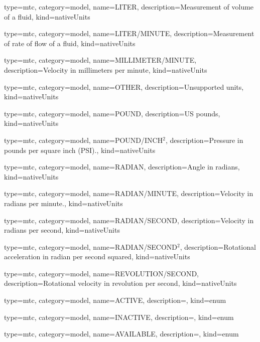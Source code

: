 {
  type=mtc,
  category=model,
  name={LITER},
  description={Measurement of volume of a fluid},
  kind={nativeUnits}
}


{
  type=mtc,
  category=model,
  name={LITER/MINUTE},
  description={Measurement of rate of flow of a fluid},
  kind={nativeUnits}
}


{
  type=mtc,
  category=model,
  name={MILLIMETER/MINUTE},
  description={Velocity in millimeters per minute},
  kind={nativeUnits}
}


{
  type=mtc,
  category=model,
  name={OTHER},
  description={Unsupported units},
  kind={nativeUnits}
}


{
  type=mtc,
  category=model,
  name={POUND},
  description={US pounds},
  kind={nativeUnits}
}


{
  type=mtc,
  category=model,
  name={POUND/INCH$^2$},
  description={Pressure in pounds per square inch (PSI).},
  kind={nativeUnits}
}


{
  type=mtc,
  category=model,
  name={RADIAN},
  description={Angle in radians},
  kind={nativeUnits}
}


{
  type=mtc,
  category=model,
  name={RADIAN/MINUTE},
  description={Velocity in radians per minute.},
  kind={nativeUnits}
}


{
  type=mtc,
  category=model,
  name={RADIAN/SECOND},
  description={Velocity in radians per second},
  kind={nativeUnits}
}


{
  type=mtc,
  category=model,
  name={RADIAN/SECOND$^2$},
  description={Rotational acceleration in radian per second squared},
  kind={nativeUnits}
}


{
  type=mtc,
  category=model,
  name={REVOLUTION/SECOND},
  description={Rotational velocity in revolution per second},
  kind={nativeUnits}
}


{
  type=mtc,
  category=model,
  name={ACTIVE},
  description={},
  kind={enum}
}


{
  type=mtc,
  category=model,
  name={INACTIVE},
  description={},
  kind={enum}
}


{
  type=mtc,
  category=model,
  name={AVAILABLE},
  description={},
  kind={enum}
}


